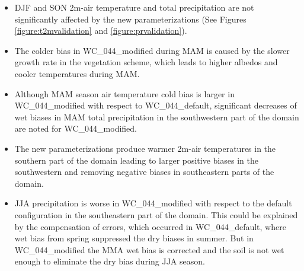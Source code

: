 \documentclass[a0b,landscape]{a0poster}
\begin{document}
\begin{multicols*}{4}
\begin{minipage}[t]{\linewidth}
\begin{center}

\end{center}
\end{minipage}


\begin{itemize}
  \item DJF and SON 2m-air temperature and total precipitation are not significantly
  affected by the new parameterizations (See Figures \ref{figure:t2mvalidation} and \ref{figure:prvalidation}).

  \item The colder bias in WC\_044\_modified during MAM is caused by the slower growth rate in the vegetation scheme, which leads to higher albedos and cooler temperatures during MAM.

  \item Although MAM season air temperature cold bias is larger in WC\_044\_modified with respect to WC\_044\_default,
  significant decreases of wet biases in MAM total precipitation in the southwestern part of the domain are noted for  WC\_044\_modified.

  \item The new parameterizations produce warmer 2m-air temperatures in the southern part
  of the domain leading to larger positive biases in the southwestern and removing negative biases in
  southeastern parts of the domain.
  \item JJA precipitation is worse in WC\_044\_modified with respect to
  the default configuration in the southeastern part of the domain. This could be explained by the compensation of errors, which
  occurred in WC\_044\_default, where wet bias from spring suppressed the dry biases in summer. But in WC\_044\_modified the
  MMA wet bias is corrected and the soil is not wet enough to eliminate the dry bias during JJA season.
\end{itemize}


\end{multicols*}
\end{document}
